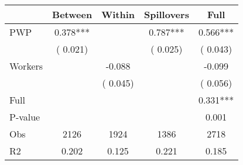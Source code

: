 
\begin{tabular}{l*{4}{c}}\hline&\multicolumn{1}{c}{Between}&\multicolumn{1}{c}{Within}&\multicolumn{1}{c}{Spillovers}&\multicolumn{1}{c}{Full}\\ \hline
 PWP           &              0.378***      &                                               &        0.787*** &         0.566***                            \\ 
                               &        (       0.021)           &                                       &       (       0.025)     &      (       0.043)                                           \\ 
 Workers       &                                               &       -0.088    &                                &            -0.099                            \\ 
                               &                                               & (       0.045)                  &                                        &      (       0.056)                                           \\ 
\hline                                                                                                                                                                                                                                            
 Full                  &                                               &                                               &                                        &             0.331***                                     \\ 
 P-value               &                                               &                                               &                                        &             0.001                                           \\ 
 Obs                   &               2126               &       1924                       &       1386                &              2718                                               \\ 
 R2                    &                      0.202              &              0.125                      &              0.221               &                     0.185                                              \\ 
\hline \end{tabular}                                                                                                                                                                                                              